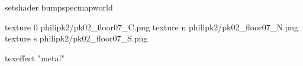 setshader bumpspecmapworld

texture 0 philipk2/pk02_floor07_C.png
texture n philipk2/pk02_floor07_N.png
texture s philipk2/pk02_floor07_S.png

texeffect "metal"
